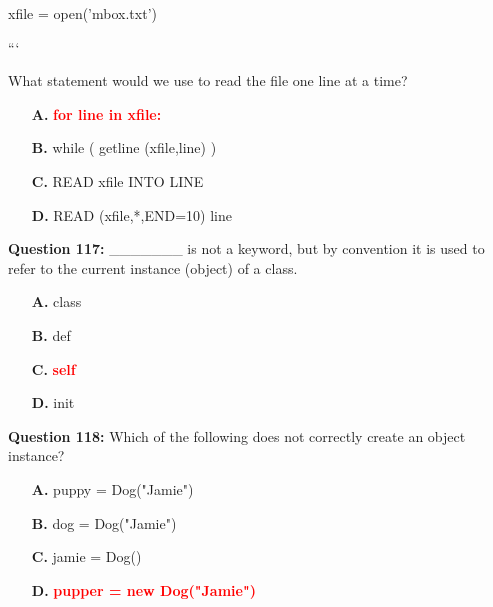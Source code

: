 \documentclass[12pt,a4paper]{article}
\begin{document}
\newline
xfile = open('mbox.txt')\newline

\newline
```\newline

\newline
\newline

\newline
What statement would we use to read the file one line at a time?

\begin{itemize}
    \item[\textbf{A.}] \textcolor{red}{\textbf{for line in xfile:}}
    \item[\textbf{B.}] while ( getline (xfile,line) )
    \item[\textbf{C.}] READ xfile INTO LINE
    \item[\textbf{D.}] READ (xfile,*,END=10) line
\end{itemize}

\vspace{0.5cm}

\textbf{Question 117:} _______ is not a keyword, but by convention it is used to refer to the current instance (object) of a class.

\begin{itemize}
    \item[\textbf{A.}] class
    \item[\textbf{B.}] def
    \item[\textbf{C.}] \textcolor{red}{\textbf{self}}
    \item[\textbf{D.}] init
\end{itemize}

\vspace{0.5cm}

\textbf{Question 118:} Which of the following does not correctly create an object instance?

\begin{itemize}
    \item[\textbf{A.}] puppy = Dog("Jamie")
    \item[\textbf{B.}] dog = Dog("Jamie")
    \item[\textbf{C.}] jamie = Dog()
    \item[\textbf{D.}] \textcolor{red}{\textbf{pupper = new Dog("Jamie")}}
\end{itemize}

\vspace{0.5cm}
\end{document}
